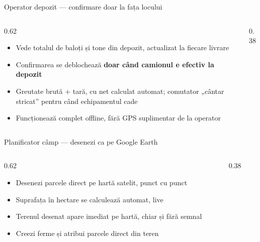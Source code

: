 \documentclass[aspectratio=169,10pt]{beamer}
\begin{document}
\begin{frame}{Operator depozit — confirmare doar la fața locului}
  \begin{columns}[T]
    \begin{column}{0.62\linewidth}
      \vspace{0.3cm}
      \begin{itemize}
        \item Vede totalul de baloți și tone din depozit, actualizat la fiecare livrare
        \item Confirmarea se deblochează \textbf{doar când camionul e efectiv la depozit}
        \item Greutate brută + tară, cu net calculat automat; comutator „cântar stricat'' pentru când echipamentul cade
        \item Funcționează complet offline, fără GPS suplimentar de la operator
      \end{itemize}
    \end{column}
    \begin{column}{0.38\linewidth}
    \end{column}
  \end{columns}
\end{frame}

\begin{frame}{Planificator câmp — desenezi ca pe Google Earth}
  \begin{columns}[T]
    \begin{column}{0.62\linewidth}
      \vspace{0.3cm}
      \begin{itemize}
        \item Desenezi parcele direct pe hartă satelit, punct cu punct
        \item Suprafața în hectare se calculează automat, live
        \item Terenul desenat apare imediat pe hartă, chiar și fără semnal
        \item Creezi ferme și atribui parcele direct din teren
      \end{itemize}
    \end{column}
    \begin{column}{0.38\linewidth}
    \end{column}
  \end{columns}
\end{frame}
\end{document}
